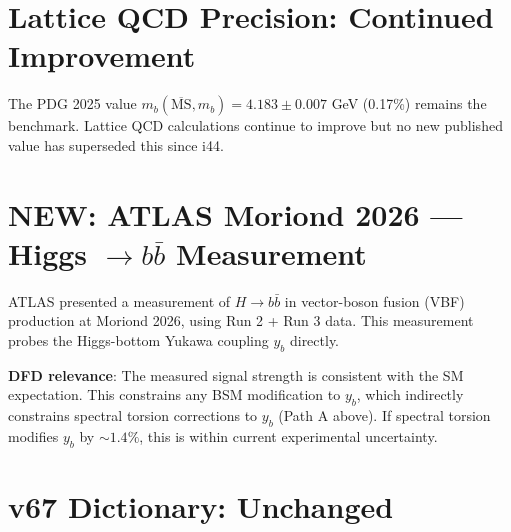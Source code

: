 \documentclass[11pt,a4paper]{article}
\newcommand{\NEW}{\textcolor{dfdblue}{\textbf{NEW}}}
\begin{document}
\section{Lattice QCD Precision: Continued Improvement}

The PDG 2025 value $m_b(\overline{\text{MS}}, m_b) = 4.183 \pm 0.007$ GeV (0.17\%) remains the benchmark. Lattice QCD calculations continue to improve but no new published value has superseded this since i44.

\section{\NEW: ATLAS Moriond 2026 --- Higgs $\to b\bar{b}$ Measurement}

\begin{tcolorbox}[colback=blue!5!white, colframe=blue!60!black,
  title={ATLAS Moriond 2026: $H \to b\bar{b}$ in VBF Production}]

ATLAS presented a measurement of $H \to b\bar{b}$ in vector-boson fusion (VBF) production at Moriond 2026, using Run 2 + Run 3 data. This measurement probes the Higgs-bottom Yukawa coupling $y_b$ directly.

\textbf{DFD relevance}: The measured signal strength is consistent with the SM expectation. This constrains any BSM modification to $y_b$, which indirectly constrains spectral torsion corrections to $y_b$ (Path A above). If spectral torsion modifies $y_b$ by $\sim 1.4\%$, this is within current experimental uncertainty.
\end{tcolorbox}

\section{v67 Dictionary: Unchanged}
\end{document}

